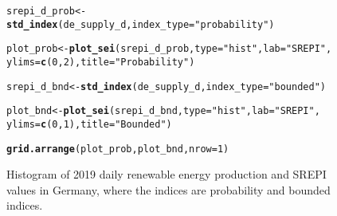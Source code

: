\documentclass[article,shortnames,nojss]{jss}\usepackage[]{graphicx}\usepackage[]{xcolor}
\makeatletter
\newcommand{\hlnum}[1]{\textcolor[rgb]{0.686,0.059,0.569}{#1}}%
\newcommand{\hlstr}[1]{\textcolor[rgb]{0.192,0.494,0.8}{#1}}%
\newcommand{\hlstd}[1]{\textcolor[rgb]{0.345,0.345,0.345}{#1}}%
\newcommand{\hlkwb}[1]{\textcolor[rgb]{0.69,0.353,0.396}{#1}}%
\newcommand{\hlkwc}[1]{\textcolor[rgb]{0.333,0.667,0.333}{#1}}%
\newcommand{\hlkwd}[1]{\textcolor[rgb]{0.737,0.353,0.396}{\textbf{#1}}}%
\newenvironment{kframe}{%
 \def\at@end@of@kframe{}%
 \ifinner\ifhmode%
  \def\at@end@of@kframe{\end{minipage}}%
  \begin{minipage}{\columnwidth}%
 \fi\fi%
 \def\FrameCommand##1{\hskip\@totalleftmargin \hskip-\fboxsep
 \colorbox{shadecolor}{##1}\hskip-\fboxsep
     \hskip-\linewidth \hskip-\@totalleftmargin \hskip\columnwidth}%
 \MakeFramed {\advance\hsize-\width
   \@totalleftmargin\z@ \linewidth\hsize
   \@setminipage}}%
 {\par\unskip\endMakeFramed%
 \at@end@of@kframe}
\newenvironment{knitrout}{}{} %
\makeatother
\begin{document}
\begin{figure}
\begin{knitrout}
\color{fgcolor}\begin{kframe}
\begin{alltt}
\hlstd{srepi_d_prob} \hlkwb{<-} \hlkwd{std_index}\hlstd{(de_supply_d,} \hlkwc{index_type} \hlstd{=} \hlstr{"probability"}\hlstd{)}
\end{alltt}


{\ttfamily\noindent\bfseries{}}\begin{alltt}
\hlstd{plot_prob} \hlkwb{<-} \hlkwd{plot_sei}\hlstd{(srepi_d_prob,} \hlkwc{type} \hlstd{=} \hlstr{"hist"}\hlstd{,} \hlkwc{lab} \hlstd{=} \hlstr{"SREPI"}\hlstd{,}
                      \hlkwc{ylims} \hlstd{=} \hlkwd{c}\hlstd{(}\hlnum{0}\hlstd{,} \hlnum{2}\hlstd{),} \hlkwc{title} \hlstd{=} \hlstr{"Probability"}\hlstd{)}
\end{alltt}


{\ttfamily\noindent\bfseries{}}\begin{alltt}
\hlstd{srepi_d_bnd} \hlkwb{<-} \hlkwd{std_index}\hlstd{(de_supply_d,} \hlkwc{index_type} \hlstd{=} \hlstr{"bounded"}\hlstd{)}
\end{alltt}


{\ttfamily\noindent\bfseries{}}\begin{alltt}
\hlstd{plot_bnd} \hlkwb{<-} \hlkwd{plot_sei}\hlstd{(srepi_d_bnd,} \hlkwc{type} \hlstd{=} \hlstr{"hist"}\hlstd{,} \hlkwc{lab} \hlstd{=} \hlstr{"SREPI"}\hlstd{,}
                     \hlkwc{ylims} \hlstd{=} \hlkwd{c}\hlstd{(}\hlnum{0}\hlstd{,} \hlnum{1}\hlstd{),} \hlkwc{title} \hlstd{=} \hlstr{"Bounded"}\hlstd{)}
\end{alltt}


{\ttfamily\noindent\bfseries{}}\begin{alltt}
\hlkwd{grid.arrange}\hlstd{(plot_prob, plot_bnd,} \hlkwc{nrow} \hlstd{=} \hlnum{1}\hlstd{)}
\end{alltt}


{\ttfamily\noindent\bfseries\color{errorcolor}{\#\# Error in eval(expr, envir, enclos): object 'plot\_prob' not found}}\end{kframe}
\end{knitrout}
\caption{Histogram of 2019 daily renewable energy production and SREPI values in Germany, where the indices are probability and bounded indices.}
\label{fig:dist_raw_unif}
\end{figure}
\end{document}

